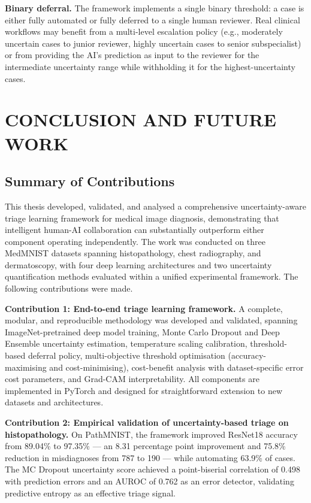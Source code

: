\textbf{Binary deferral.} The framework implements a single binary threshold: a case is either fully automated or fully deferred to a single human reviewer. Real clinical workflows may benefit from a multi-level escalation policy (e.g., moderately uncertain cases to junior reviewer, highly uncertain cases to senior subspecialist) or from providing the AI's prediction as input to the reviewer for the intermediate uncertainty range while withholding it for the highest-uncertainty cases.


\chapter{CONCLUSION AND FUTURE WORK}

\section{Summary of Contributions}

This thesis developed, validated, and analysed a comprehensive uncertainty-aware triage learning framework for medical image diagnosis, demonstrating that intelligent human-AI collaboration can substantially outperform either component operating independently. The work was conducted on three MedMNIST datasets spanning histopathology, chest radiography, and dermatoscopy, with four deep learning architectures and two uncertainty quantification methods evaluated within a unified experimental framework. The following contributions were made.

\textbf{Contribution 1: End-to-end triage learning framework.} A complete, modular, and reproducible methodology was developed and validated, spanning ImageNet-pretrained deep model training, Monte Carlo Dropout and Deep Ensemble uncertainty estimation, temperature scaling calibration, threshold-based deferral policy, multi-objective threshold optimisation (accuracy-maximising and cost-minimising), cost-benefit analysis with dataset-specific error cost parameters, and Grad-CAM interpretability. All components are implemented in PyTorch and designed for straightforward extension to new datasets and architectures.

\textbf{Contribution 2: Empirical validation of uncertainty-based triage on histopathology.} On PathMNIST, the framework improved ResNet18 accuracy from 89.04\% to 97.35\% --- an 8.31 percentage point improvement and 75.8\% reduction in misdiagnoses from 787 to 190 --- while automating 63.9\% of cases. The MC Dropout uncertainty score achieved a point-biserial correlation of 0.498 with prediction errors and an AUROC of 0.762 as an error detector, validating predictive entropy as an effective triage signal.

